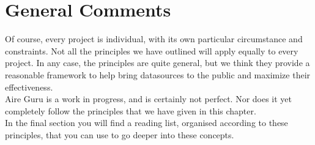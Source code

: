 \section{General Comments}

Of course, every project is individual, with its own particular circumstance and constraints. Not all
the principles we have outlined will apply equally to every project. In any case, the principles are
quite general, but we think they provide a reasonable framework to help bring datasources to the public
and maximize their effectiveness.\\

Aire Guru is a work in progress, and is certainly not perfect. Nor does it yet completely follow the principles
that we have given in this chapter.\\

In the final section you will find a reading list, organised according to these principles, that you
can use to go deeper into these concepts.\\